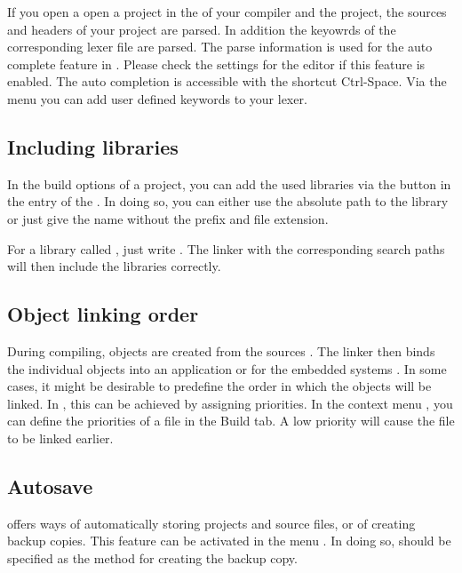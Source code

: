 If you open a open a project in \codeblocks the  of your compiler and the project, the sources and headers of your project are parsed. In addition the keyowrds of the corresponding lexer file are parsed. The parse information is used for the auto complete feature in \codeblocks. Please check the settings for the editor if this feature is enabled. The auto completion is accessible with the shortcut Ctrl-Space. Via the menu  you can add user defined keywords to your lexer.

\subsection{Including libraries}

In the build options of a project, you can add the used libraries via the  button in the  entry of the . In doing so, you can either use the absolute path to the library or just give the name without the  prefix and file extension.


For a library called , just write . The linker with the corresponding search paths will then include the libraries correctly.


\subsection{Object linking order}

During compiling, objects  are created from the sources . The linker then binds the individual objects into an application  or for the embedded systems . In some cases, it might be desirable to predefine the order in which the objects will be linked. In \codeblocks, this can be achieved by assigning priorities. In the context menu , you can define the priorities of a file in the Build tab. A low priority will cause the file to be linked earlier.

\subsection{Autosave}

\codeblocks offers ways of automatically storing projects and source files, or of creating backup copies. This feature can be activated in the menu . In doing so,  should be specified as the method for creating the backup copy.


